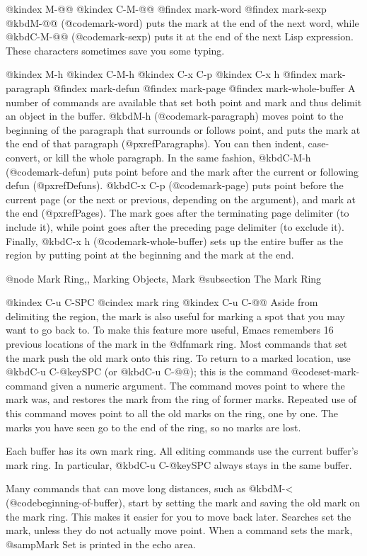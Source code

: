 {{{@kindex M-@@
@kindex C-M-@@
@findex mark-word
@findex mark-sexp
@kbd{M-@@} (@code{mark-word}) puts the mark at the end of the next word,
while @kbd{C-M-@@} (@code{mark-sexp}) puts it at the end of the next Lisp
expression. These characters sometimes save you some typing.

@kindex M-h
@kindex C-M-h
@kindex C-x C-p
@kindex C-x h
@findex mark-paragraph
@findex mark-defun
@findex mark-page
@findex mark-whole-buffer
   A number of commands are available that set both point and mark and
thus delimit an object in the buffer.  @kbd{M-h} (@code{mark-paragraph})
moves point to the beginning of the paragraph that surrounds or follows
point, and puts the mark at the end of that paragraph
(@pxref{Paragraphs}).  You can then indent, case-convert, or kill the
whole paragraph.  In the same fashion, @kbd{C-M-h} (@code{mark-defun})
puts point before and the mark after the current or following defun
(@pxref{Defuns}).  @kbd{C-x C-p} (@code{mark-page}) puts point before
the current page (or the next or previous, depending on the argument),
and mark at the end (@pxref{Pages}).  The mark goes after the
terminating page delimiter (to include it), while point goes after the
preceding page delimiter (to exclude it).  Finally, @kbd{C-x h}
(@code{mark-whole-buffer}) sets up the entire buffer as the region by
putting point at the beginning and the mark at the end.

@node Mark Ring,, Marking Objects, Mark
@subsection The Mark Ring

@kindex C-u C-SPC
@cindex mark ring
@kindex C-u C-@@
  Aside from delimiting the region, the mark is also useful for marking
a spot that you may want to go back to.  To make this feature more
useful, Emacs remembers 16 previous locations of the mark in the
@dfn{mark ring}.  Most commands that set the mark push the old mark onto
this ring.  To return to a marked location, use @kbd{C-u C-@key{SPC}}
(or @kbd{C-u C-@@}); this is the command @code{set-mark-command} given a
numeric argument.  The command moves point to where the mark was, and
restores the mark from the ring of former marks. Repeated use of this
command moves point to all the old marks on the ring, one by one.
The marks you have seen go to the end of the ring, so no marks are lost.

  Each buffer has its own mark ring.  All editing commands use the current
buffer's mark ring.  In particular, @kbd{C-u C-@key{SPC}} always stays in
the same buffer.

  Many commands that can move long distances, such as @kbd{M-<}
(@code{beginning-of-buffer}), start by setting the mark and saving the
old mark on the mark ring.  This makes it easier for you to move back
later.  Searches set the mark, unless they do not actually move point.
When a command sets the mark, @samp{Mark Set} is printed in the
echo area.

}}}
